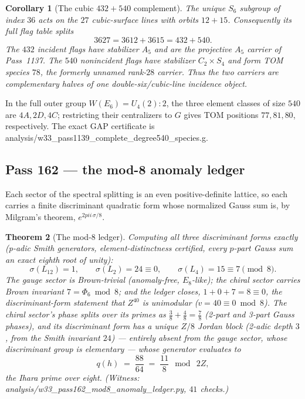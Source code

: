 \documentclass[12pt,a4paper]{article}
\def\mathbb#1{#1}%
\def\texttt#1{#1}%
\def\Phi#1{Phi#1}%
\def\pi{pi}%
\def\cdot{ }%
\newtheorem{theorem}{Theorem}[section]
\newtheorem{corollary}[theorem]{Corollary}
\theoremstyle{definition}
\begin{document}
\begin{corollary}[The cubic $432+540$ complement] %
\label{cor:double-six-432-540}
The unique $S_6$ subgroup of index $36$ acts on the $27$ cubic-surface
lines with orbits $12+15$.  Consequently its full flag table splits
\[
\boxed{36\cdot27=36\cdot12+36\cdot15=432+540.} %
\]
The $432$ incident flags have stabilizer $A_5$ and are the projective
$A_5$ carrier of Pass~1137.  The $540$ nonincident flags have stabilizer %
$C_2\times S_4$ and form TOM species $78$, the formerly unnamed rank-$28$
carrier.  Thus the two carriers are complementary halves of one
double-six/cubic-line incidence object.
\end{corollary}

\noindent
In the full outer group $W(E_6)=U_4(2):2$, the three element classes of
size $540$ are $4A,2D,4C$; restricting their centralizers to $G$ gives %
TOM positions $77,81,80$, respectively.  The exact GAP certificate is
\texttt{analysis/w33\_pass1139\_complete\_degree540\_species.g}.

\subsection{Pass 162 --- the mod-8 anomaly ledger}
\label{ssec:pass162}

Each sector of the spectral splitting is an even positive-definite lattice,
so each carries a finite discriminant quadratic form whose normalized Gauss
sum is, by Milgram's theorem, $e^{2\pi i\,\sigma/8}$.

\begin{theorem}[The mod-8 ledger]
\label{thm:mod8-ledger}
Computing all three discriminant forms exactly (p-adic Smith generators,
element-distinctness certified, every $p$-part Gauss sum an exact eighth
root of unity):
\[
  \sigma(L_{12})=1,\qquad
  \sigma(L_2)=24\equiv 0,\qquad
  \sigma(L_4)=15\equiv 7\pmod 8 .
\]
The gauge sector is Brown-trivial (anomaly-free, $E_8$-like); the chiral
sector carries Brown invariant $7=\Phi_6\bmod 8$; and the ledger closes,
$1+0+7=8\equiv0$, the discriminant-form statement that $\mathbb Z^{40}$ is
unimodular ($v=40\equiv0\bmod 8$). The chiral sector's phase splits over
its primes as $\tfrac38+\tfrac48=\tfrac78$ (2-part and 3-part Gauss
phases), and its discriminant form has a unique $\mathbb Z/8$ Jordan block
(2-adic depth $3$, from the Smith invariant $24$) --- entirely absent from
the gauge sector, whose discriminant group is elementary --- whose
generator evaluates to
\[
  q(h)\;=\;\frac{88}{64}\;=\;\frac{11}{8}\ \bmod\ 2\mathbb Z,
\]
the Ihara prime over eight. (Witness:
\texttt{analysis/w33\_pass162\_mod8\_anomaly\_ledger.py}, $41$ checks.)
\end{theorem}
\end{document}
